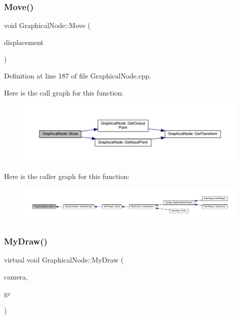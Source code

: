 \subsubsection{\texorpdfstring{Move()}{Move()}}
{\footnotesize\ttfamily void Graphical\+Node\+::\+Move (\begin{DoxyParamCaption}\item[{wx\+Point2\+D\+Double}]{displacement }\end{DoxyParamCaption})}



Definition at line 187 of file Graphical\+Node.\+cpp.

Here is the call graph for this function\+:
\nopagebreak
\begin{figure}[H]
\begin{center}
\leavevmode
\includegraphics[width=350pt]{class_graphical_node_a430fbd68a5d907ed9e73981ab3c499fb_cgraph}
\end{center}
\end{figure}
Here is the caller graph for this function\+:
\nopagebreak
\begin{figure}[H]
\begin{center}
\leavevmode
\includegraphics[width=350pt]{class_graphical_node_a430fbd68a5d907ed9e73981ab3c499fb_icgraph}
\end{center}
\end{figure}
\mbox{\label{class_graphical_node_a4a5d4f48454a9721a940499d4f59b0ce}} 
\subsubsection{\texorpdfstring{My\+Draw()}{MyDraw()}}
{\footnotesize\ttfamily virtual void Graphical\+Node\+::\+My\+Draw (\begin{DoxyParamCaption}\item[{const wx\+Affine\+Matrix2D \&}]{camera,  }\item[{wx\+Graphics\+Context $\ast$}]{gc }\end{DoxyParamCaption})\hspace{0.3cm}{\ttfamily [pure virtual]}}



